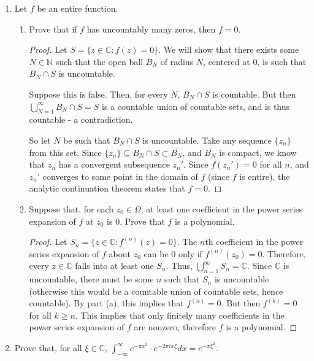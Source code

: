 \documentclass[10pt]{article}
\newcommand{\N}{\mathbb{N}}
\newcommand{\C}{\mathbb{C}}
\newcommand{\Int}{\displaystyle\int}
\renewcommand{\bar}{\overline}
\begin{document}
\begin{enumerate}
\item Let $f$ be an entire function.
\begin{enumerate}
\item Prove that if $f$ has uncountably many zeros, then $f = 0$.

\begin{proof}

Let $S = \{z \in \C : f(z) = 0\}$.  We will show that there exists some $N \in \N$ such that the open ball $B_N$ of radius $N$, centered at $0$, is such that $B_N \cap S$ is uncountable.

Suppose this is false.  Then, for every $N$, $B_N \cap S$ is countable.  But then $\bigcup_{N=1}^\infty B_N \cap S = S$ is a countable union of countable sets, and is thus countable - a contradiction.

So let $N$ be such that $B_N \cap S$ is uncountable.  Take any sequence $\{z_n\}$ from this set.  Since $\{z_n\} \subseteq B_N \cap S \subset \bar{B_N}$, and $\bar{B_N}$ is compact, we know that $z_n$ has a convergent subsequence $z_n'$.  Since $f(z_n') = 0$ for all $n$, and $z_n'$ converges to some point in the domain of $f$ (since $f$ is entire), the analytic continuation theorem states that $f = 0$.

\end{proof}

\item Suppose that, for each $z_0 \in \Omega$, at least one coefficient in the power series expansion of $f$ at $z_0$ is 0.  Prove that $f$ is a polynomial.

\begin{proof}

Let $S_n = \{z \in \C : f^{(n)}(z) = 0 \}$.  The $n$th coefficient in the power series expansion of $f$ about $z_0$ can be $0$ only if $f^{(n)}(z_0) = 0$.  Therefore, every $z \in \C$ falls into at least one $S_n$.  Thus, $\bigcup_{n=1}^\infty S_n = \C$.  Since $\C$ is uncountable, there must be some $n$ such that $S_n$ is uncountable (otherwise this would be a countable union of countable sets, hence countable).  By part (a), this implies that $f^{(n)} = 0$.  But then $f^{(k)} = 0$ for all $k \geq n$.  This implies that only finitely many coefficients in the power series expansion of $f$ are nonzero, therefore $f$ is a polynomial.

\end{proof}

\end{enumerate}

\item Prove that, for all $\xi \in \C$,
$
\Int_{-\infty}^\infty e^{-\pi x^2} \cdot e^{-2\pi i x \xi} dx = e^{- \pi \xi^2}.
$


\end{enumerate}
\end{document}
